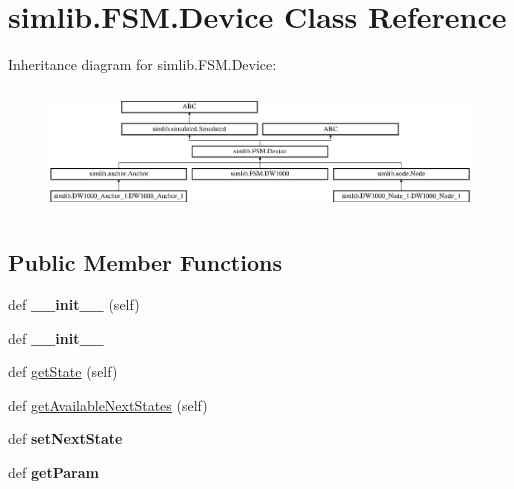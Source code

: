 \hypertarget{classsimlib_1_1_f_s_m_1_1_device}{}\section{simlib.\+F\+S\+M.\+Device Class Reference}
\label{classsimlib_1_1_f_s_m_1_1_device}
Inheritance diagram for simlib.\+F\+S\+M.\+Device\+:\begin{figure}[H]
\begin{center}
\leavevmode
\includegraphics[height=3.321471cm]{classsimlib_1_1_f_s_m_1_1_device}
\end{center}
\end{figure}
\subsection*{Public Member Functions}
\begin{DoxyCompactItemize}
\item 
\mbox{\label{classsimlib_1_1_f_s_m_1_1_device_a5696250d05d766c549c37faa84db7693}} 
def {\bfseries \+\_\+\+\_\+init\+\_\+\+\_\+} (self)
\item 
\mbox{\label{classsimlib_1_1_f_s_m_1_1_device_a306e757fa92528b888de0f1b00b0be5c}} 
def {\bfseries \+\_\+\+\_\+init\+\_\+\+\_\+}
\item 
def \mbox{\hyperlink{classsimlib_1_1_f_s_m_1_1_device_a2f0fc2dd8e6da5688c00ed2004538abb}{get\+State}} (self)
\item 
def \mbox{\hyperlink{classsimlib_1_1_f_s_m_1_1_device_a66671fefc8ed8e04091244d40ae9eb41}{get\+Available\+Next\+States}} (self)
\item 
\mbox{\label{classsimlib_1_1_f_s_m_1_1_device_a816c8a7e8c01c9d8e7748f083903466a}} 
def {\bfseries set\+Next\+State}
\item 
\mbox{\label{classsimlib_1_1_f_s_m_1_1_device_a82fec7b5aa14a400069f9170640c8666}} 
def {\bfseries get\+Param}
\end{DoxyCompactItemize}
